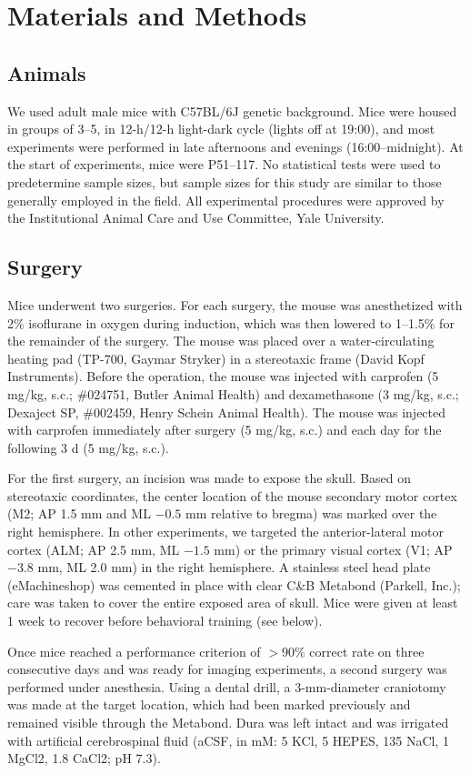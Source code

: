 \section{Materials and Methods}

\subsection*{Animals}
We used adult male mice with C57BL/6J genetic background. Mice were housed in groups of 3--5, in 12-h/12-h light-dark cycle (lights off at 19:00), and most experiments were performed in late afternoons and evenings (16:00--midnight). At the start of experiments, mice were P51--117. No statistical tests were used to predetermine sample sizes, but sample sizes for this study are similar to those generally employed in the field. All experimental procedures were approved by the Institutional Animal Care and Use Committee, Yale University.

\subsection*{Surgery}
Mice underwent two surgeries. For each surgery, the mouse was anesthetized with 2\% isoflurane in oxygen during induction, which was then lowered to 1–1.5\% for the remainder of the surgery. The mouse was placed over a water-circulating heating pad (TP-700, Gaymar Stryker) in a stereotaxic frame (David Kopf Instruments). Before the operation, the mouse was injected with carprofen (5 mg/kg, s.c.; \#024751, Butler Animal Health) and dexamethasone (3 mg/kg, s.c.; Dexaject SP, \#002459, Henry Schein Animal Health). The mouse was injected with carprofen immediately after surgery (5 mg/kg, s.c.) and each day for the following 3 d (5 mg/kg, s.c.). 

For the first surgery, an incision was made to expose the skull. Based on stereotaxic coordinates, the center location of the mouse secondary motor cortex (M2; AP 1.5 mm and ML $-0.5$ mm relative to bregma) was marked over the right hemisphere. In other experiments, we targeted the anterior-lateral motor cortex (ALM; AP 2.5 mm, ML $-1.5$ mm) or the primary visual cortex (V1; AP $-3.8$ mm, ML 2.0 mm) in the right hemisphere. A stainless steel head plate (eMachineshop) was cemented in place with clear C\&B Metabond (Parkell, Inc.); care was taken to cover the entire exposed area of skull. Mice were given at least 1 week to recover before behavioral training (see below). 

Once mice reached a performance criterion of $>90\%$ correct rate on three consecutive days and was ready for imaging experiments, a second surgery was performed under anesthesia. Using a dental drill, a 3-mm-diameter craniotomy was made at the target location, which had been marked previously and remained visible through the Metabond. Dura was left intact and was irrigated with artificial cerebrospinal fluid (aCSF, in mM: 5 KCl, 5 HEPES, 135 NaCl, 1 MgCl2, 1.8 CaCl2; pH 7.3). 

